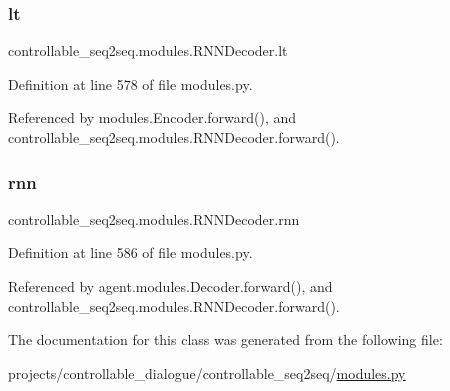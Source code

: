\mbox{\label{classcontrollable__seq2seq_1_1modules_1_1RNNDecoder_a3167b4c51b0b099778efeeedb73962d7}} 
\subsubsection{\texorpdfstring{lt}{lt}}
{\footnotesize\ttfamily controllable\+\_\+seq2seq.\+modules.\+R\+N\+N\+Decoder.\+lt}



Definition at line 578 of file modules.\+py.



Referenced by modules.\+Encoder.\+forward(), and controllable\+\_\+seq2seq.\+modules.\+R\+N\+N\+Decoder.\+forward().

\mbox{\label{classcontrollable__seq2seq_1_1modules_1_1RNNDecoder_afd3aee0e3d5cfff379453a6fe667cd4c}} 
\subsubsection{\texorpdfstring{rnn}{rnn}}
{\footnotesize\ttfamily controllable\+\_\+seq2seq.\+modules.\+R\+N\+N\+Decoder.\+rnn}



Definition at line 586 of file modules.\+py.



Referenced by agent.\+modules.\+Decoder.\+forward(), and controllable\+\_\+seq2seq.\+modules.\+R\+N\+N\+Decoder.\+forward().



The documentation for this class was generated from the following file\+:\begin{DoxyCompactItemize}
\item 
projects/controllable\+\_\+dialogue/controllable\+\_\+seq2seq/\hyperlink{projects_2controllable__dialogue_2controllable__seq2seq_2modules_8py}{modules.\+py}\end{DoxyCompactItemize}
